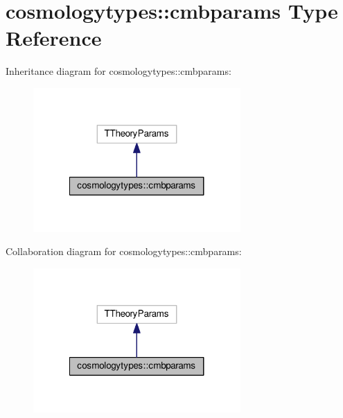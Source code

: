 \hypertarget{structcosmologytypes_1_1cmbparams}{}\section{cosmologytypes\+:\+:cmbparams Type Reference}
\label{structcosmologytypes_1_1cmbparams}


Inheritance diagram for cosmologytypes\+:\+:cmbparams\+:
\nopagebreak
\begin{figure}[H]
\begin{center}
\leavevmode
\includegraphics[width=224pt]{structcosmologytypes_1_1cmbparams__inherit__graph}
\end{center}
\end{figure}


Collaboration diagram for cosmologytypes\+:\+:cmbparams\+:
\nopagebreak
\begin{figure}[H]
\begin{center}
\leavevmode
\includegraphics[width=224pt]{structcosmologytypes_1_1cmbparams__coll__graph}
\end{center}
\end{figure}
